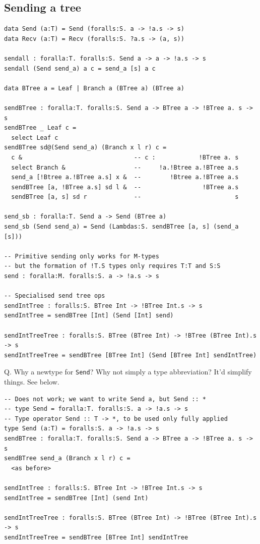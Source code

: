 \subsection{Sending a tree}
\label{sec:sending-tree}

\begin{lstlisting}
data Send (a:T) = Send (foralls:S. a -> !a.s -> s)
data Recv (a:T) = Recv (foralls:S. ?a.s -> (a, s))

sendall : foralla:T. foralls:S. Send a -> a -> !a.s -> s
sendall (Send send_a) a c = send_a [s] a c

data BTree a = Leaf | Branch a (BTree a) (BTree a)

sendBTree : foralla:T. foralls:S. Send a -> BTree a -> !BTree a. s -> s
sendBTree _ Leaf c = 
  select Leaf c
sendBTree sd@(Send send_a) (Branch x l r) c =
  c &                               -- c :            !BTree a. s
  select Branch &                   --     !a.!Btree a.!BTree a.s
  send_a [!Btree a.!BTree a.s] x &  --        !Btree a.!BTree a.s
  sendBTree [a, !BTree a.s] sd l &  --                 !BTree a.s
  sendBTree [a, s] sd r             --                          s

send_sb : foralla:T. Send a -> Send (BTree a)
send_sb (Send send_a) = Send (Lambdas:S. sendBTree [a, s] (send_a [s]))

-- Primitive sending only works for M-types
-- but the formation of !T.S types only requires T:T and S:S
send : foralla:M. foralls:S. a -> !a.s -> s

-- Specialised send tree ops
sendIntTree : foralls:S. BTree Int -> !BTree Int.s -> s
sendIntTree = sendBTree [Int] (Send [Int] send)

sendIntTreeTree : foralls:S. BTree (BTree Int) -> !BTree (BTree Int).s -> s
sendIntTreeTree = sendBTree [BTree Int] (Send [BTree Int] sendIntTree)
\end{lstlisting}

Q. Why a newtype for \lstinline|Send|? Why not simply a type abbreviation? It'd
simplify things. See below.
%
\begin{lstlisting}
-- Does not work; we want to write Send a, but Send :: *
-- type Send = foralla:T. foralls:S. a -> !a.s -> s 
-- Type operator Send :: T -> *, to be used only fully applied
type Send (a:T) = foralls:S. a -> !a.s -> s 
sendBTree : foralla:T. foralls:S. Send a -> BTree a -> !BTree a. s -> s
sendBTree send_a (Branch x l r) c =
  <as before>

sendIntTree : foralls:S. BTree Int -> !BTree Int.s -> s
sendIntTree = sendBTree [Int] (send Int)

sendIntTreeTree : foralls:S. BTree (BTree Int) -> !BTree (BTree Int).s -> s
sendIntTreeTree = sendBTree [BTree Int] sendIntTree
\end{lstlisting}

